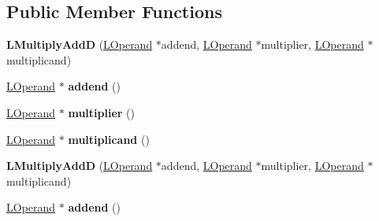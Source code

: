 \subsection*{Public Member Functions}
\begin{DoxyCompactItemize}
\item 
{\bfseries L\+Multiply\+AddD} (\hyperlink{classv8_1_1internal_1_1_l_operand}{L\+Operand} $\ast$addend, \hyperlink{classv8_1_1internal_1_1_l_operand}{L\+Operand} $\ast$multiplier, \hyperlink{classv8_1_1internal_1_1_l_operand}{L\+Operand} $\ast$multiplicand)\hypertarget{classv8_1_1internal_1_1_l_multiply_add_d_adda9b3e6704e69d365cd21ebdd1e8388}{}\label{classv8_1_1internal_1_1_l_multiply_add_d_adda9b3e6704e69d365cd21ebdd1e8388}

\item 
\hyperlink{classv8_1_1internal_1_1_l_operand}{L\+Operand} $\ast$ {\bfseries addend} ()\hypertarget{classv8_1_1internal_1_1_l_multiply_add_d_a035089376f4e7625f84c55437a842d20}{}\label{classv8_1_1internal_1_1_l_multiply_add_d_a035089376f4e7625f84c55437a842d20}

\item 
\hyperlink{classv8_1_1internal_1_1_l_operand}{L\+Operand} $\ast$ {\bfseries multiplier} ()\hypertarget{classv8_1_1internal_1_1_l_multiply_add_d_a23e4d88a87ada2c97d1578583dc168e4}{}\label{classv8_1_1internal_1_1_l_multiply_add_d_a23e4d88a87ada2c97d1578583dc168e4}

\item 
\hyperlink{classv8_1_1internal_1_1_l_operand}{L\+Operand} $\ast$ {\bfseries multiplicand} ()\hypertarget{classv8_1_1internal_1_1_l_multiply_add_d_adfc437df26c40abd1186f8a268b5683e}{}\label{classv8_1_1internal_1_1_l_multiply_add_d_adfc437df26c40abd1186f8a268b5683e}

\item 
{\bfseries L\+Multiply\+AddD} (\hyperlink{classv8_1_1internal_1_1_l_operand}{L\+Operand} $\ast$addend, \hyperlink{classv8_1_1internal_1_1_l_operand}{L\+Operand} $\ast$multiplier, \hyperlink{classv8_1_1internal_1_1_l_operand}{L\+Operand} $\ast$multiplicand)\hypertarget{classv8_1_1internal_1_1_l_multiply_add_d_adda9b3e6704e69d365cd21ebdd1e8388}{}\label{classv8_1_1internal_1_1_l_multiply_add_d_adda9b3e6704e69d365cd21ebdd1e8388}

\item 
\hyperlink{classv8_1_1internal_1_1_l_operand}{L\+Operand} $\ast$ {\bfseries addend} ()\hypertarget{classv8_1_1internal_1_1_l_multiply_add_d_a035089376f4e7625f84c55437a842d20}{}\label{classv8_1_1internal_1_1_l_multiply_add_d_a035089376f4e7625f84c55437a842d20}


\end{DoxyCompactItemize}
